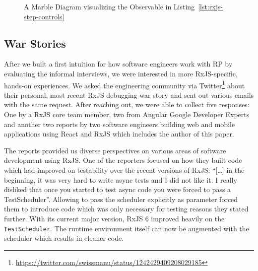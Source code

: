 \documentclass[12pt,a4paper]{article}
\begin{document}
\begin{figure}[H]
	\centering
	
	\caption{A Marble Diagram visualizing the Observable in Listing~\ref{lst:rxjs-step-controls}}
	\label{fig:marble-diagram}
\end{figure}

\subsection{War Stories}

After we built a first intuition for how software engineers work with RP by evaluating the informal interviews, we were interested in more RxJS-specific, hands-on experiences. We asked the engineering community via Twitter\footnote{\url{https://twitter.com/swissmanu/status/1242429409208029185}} about their personal, most recent RxJS debugging war story and sent out various emails with the same request. After reaching out, we were able to collect five responses: One by a RxJS core team member, two from Angular Google Developer Experts and another two reports by two software engineers building web and mobile applications using React and RxJS which includes the author of this paper.

The reports provided us diverse perspectives on various areas of software development using RxJS. One of the reporters focused on how they built code which had improved on testability over the recent versions of RxJS: ``[\dots] in the beginning, it was very hard to write async tests and I did not like it. I really disliked that once you started to test async code you were forced to pass a TestScheduler''. Allowing to pass the scheduler explicitly as parameter forced them to introduce code which was only necessary for testing reasons they stated further. With its current major version, RxJS 6 improved heavily on the  \texttt{TestScheduler}. The runtime environment itself can now be augmented with the scheduler which results in cleaner code.
\end{document}
